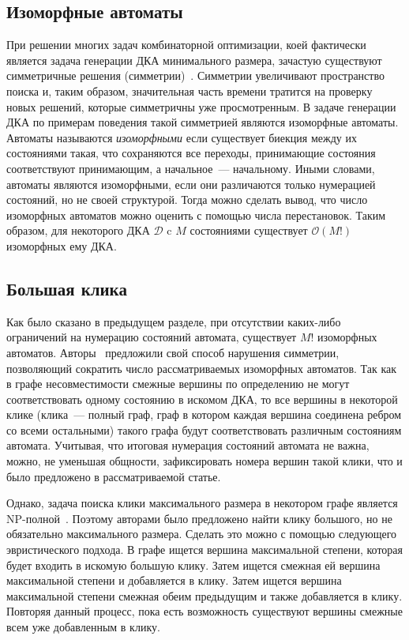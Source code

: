 \subsection{Изоморфные автоматы}
\label{sec:review:sym-breaking:isomorphic-automata}


При решении многих задач комбинаторной оптимизации, коей фактически является задача генерации ДКА минимального размера, зачастую существуют симметричные решения (симметрии)~\cite{DBLP:conf/aaai/Walsh12}.
Симметрии увеличивают пространство поиска и, таким образом, значительная часть времени тратится на проверку новых решений, которые симметричны уже просмотренным.
В задаче генерации ДКА по примерам поведения такой симметрией являются изоморфные автоматы.
Автоматы называются \emph{изоморфными} если существует биекция между их состояниями такая, что сохраняются все переходы, принимающие состояния соответствуют принимающим, а начальное~--- начальному.
Иными словами, автоматы являются изоморфными, если они различаются только нумерацией состояний, но не своей структурой.
Тогда можно сделать вывод, что число изоморфных автоматов можно оценить с помощью числа перестановок.
Таким образом, для некоторого ДКА $\mathcal{D}$ c $M$ состояниями существует $\mathcal{O}\left(M!\right)$ изоморфных ему ДКА.


\subsection{Большая клика}
\label{sec:review:sym-breaking:large-clique}

Как было сказано в предыдущем разделе, при отсутствии каких-либо ограничений на нумерацию состояний автомата, существует $M!$ изоморфных автоматов.
Авторы~\cite{heule-icgi10} предложили свой способ нарушения симметрии, позволяющий сократить число рассматриваемых изоморфных автоматов.
Так как в графе несовместимости смежные вершины по определению не могут соответствовать одному состоянию в искомом ДКА, то все вершины в некоторой клике (клика~{---} полный граф, граф в котором каждая вершина соединена ребром со всеми остальными)  такого графа будут соответствовать различным состояниям автомата.
Учитывая, что итоговая нумерация состояний автомата не важна, можно, не уменьшая общности, зафиксировать номера вершин такой клики, что и было предложено в рассматриваемой статье.

Однако, задача поиска клики максимального размера в некотором графе является NP-полной~\cite{DBLP:conf/coco/Karp72}.
Поэтому авторами было предложено найти клику большого, но не обязательно максимального размера.
Сделать это можно с помощью следующего эвристического подхода.
В графе ищется вершина максимальной степени, которая будет входить в искомую большую клику.
Затем ищется смежная ей вершина максимальной степени и добавляется в клику.
Затем ищется вершина максимальной степени смежная обеим предыдущим и также добавляется в клику. 
Повторяя данный процесс, пока есть возможность существуют вершины смежные всем уже добавленным в клику.

